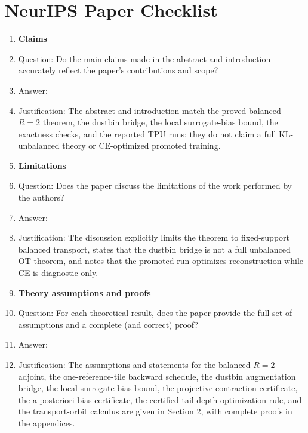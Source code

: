 \section*{NeurIPS Paper Checklist}

\begin{enumerate}

\item {\bf Claims}
    \item[] Question: Do the main claims made in the abstract and introduction accurately reflect the paper's contributions and scope?
    \item[] Answer: \answerYes{}
    \item[] Justification: The abstract and introduction match the proved balanced $R=2$ theorem, the dustbin bridge, the local surrogate-bias bound, the exactness checks, and the reported TPU runs; they do not claim a full KL-unbalanced theory or CE-optimized promoted training.

\item {\bf Limitations}
    \item[] Question: Does the paper discuss the limitations of the work performed by the authors?
    \item[] Answer: \answerYes{}
    \item[] Justification: The discussion explicitly limits the theorem to fixed-support balanced transport, states that the dustbin bridge is not a full unbalanced OT theorem, and notes that the promoted run optimizes reconstruction while CE is diagnostic only.

\item {\bf Theory assumptions and proofs}
    \item[] Question: For each theoretical result, does the paper provide the full set of assumptions and a complete (and correct) proof?
    \item[] Answer: \answerYes{}
    \item[] Justification: The assumptions and statements for the balanced $R=2$ adjoint, the one-reference-tile backward schedule, the dustbin augmentation bridge, the local surrogate-bias bound, the projective contraction certificate, the a posteriori bias certificate, the certified tail-depth optimization rule, and the transport-orbit calculus are given in Section 2, with complete proofs in the appendices.


\end{enumerate}
